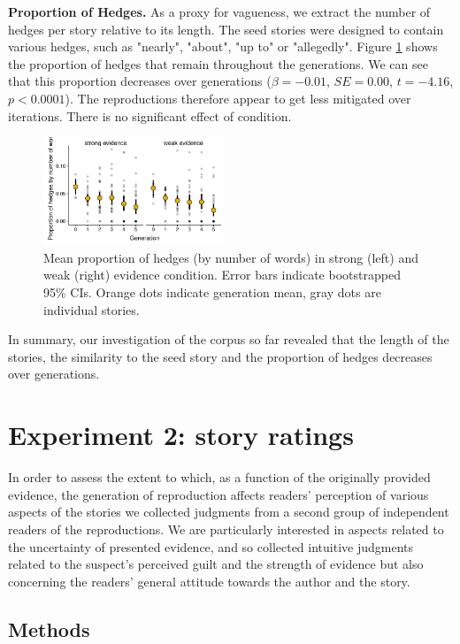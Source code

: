 \documentclass[10pt,letterpaper]{article}
\begin{document}
\textbf{Proportion of Hedges.} As a proxy for vagueness, we extract the number of hedges per story relative to its length. The seed stories were designed to contain various hedges, such as "nearly", "about", "up to" or "allegedly". Figure \ref{fig:hedges} shows the proportion of hedges that remain throughout the generations. We can see that this proportion decreases over generations ($\beta = -0.01$, $SE = 0.00$, $t = -4.16$, $p < 0.0001$). The reproductions therefore appear to get less mitigated over iterations. There is no significant effect of condition.\\

\begin{figure}[]
	\includegraphics[width=0.48\textwidth]{pics/hedges_points.pdf}
	\caption{Mean proportion of hedges (by number of words) in strong (left) and weak (right) evidence condition. Error bars indicate bootstrapped 95\% CIs. Orange dots indicate generation mean, gray dots are individual stories.} 
	\label{fig:hedges}
\end{figure}

In summary, our investigation of the corpus so far revealed that the length of the stories, the similarity to the seed story and the proportion of hedges decreases over generations.

\section{Experiment 2: story ratings}

In order to assess the extent to which, as a function of the originally provided evidence, the generation of reproduction affects readers' perception of various aspects of the stories we collected judgments from a second group of independent readers of the reproductions. We are particularly interested in aspects related to the uncertainty of presented evidence, and so collected intuitive judgments related to the suspect's perceived guilt and the strength of evidence but also concerning the readers' general attitude towards the author and the story.

\subsection{Methods}
\end{document}
